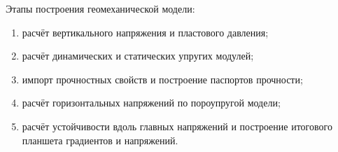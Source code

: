 Этапы построения геомеханической модели:
\begin{enumerate}[1)]
	\item расчёт вертикального напряжения и пластового давления;
	\item расчёт динамических и статических упругих модулей;
	\item импорт прочностных свойств и построение паспортов прочности;
	\item расчёт горизонтальных напряжений по пороупругой модели;
	\item расчёт устойчивости вдоль главных напряжений и построение итогового планшета градиентов и напряжений.
\end{enumerate}


